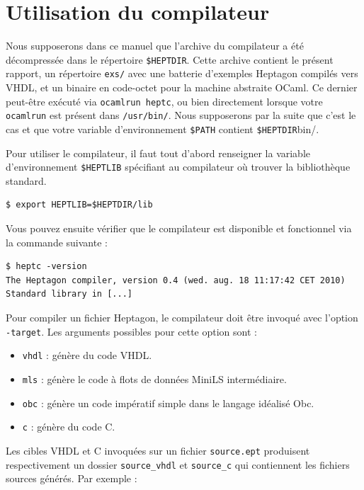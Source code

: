 \documentclass[9pt,a4paper]{article}
\newcommand{\LANG}{Heptagon}
\begin{document}
\small

\normalsize

\section{Utilisation du compilateur}

Nous supposerons dans ce manuel que l'archive du compilateur a été décompressée
dans le répertoire \verb/$HEPTDIR/. Cette archive contient le présent rapport,
un répertoire \texttt{exs/} avec une batterie d'exemples \LANG{} compilés vers
VHDL, et un binaire en code-octet pour la machine abstraite OCaml. Ce dernier
peut-être exécuté via \texttt{ocamlrun heptc}, ou bien directement lorsque votre
\texttt{ocamlrun} est présent dans \texttt{/usr/bin/}. Nous supposerons par la
suite que c'est le cas et que votre variable d'environnement \verb/$PATH/
contient \verb/$HEPTDIR/bin/.

Pour utiliser le compilateur, il faut tout d'abord renseigner la variable
d'environnement \verb/$HEPTLIB/ spécifiant au compilateur où trouver la
bibliothèque standard.

\begin{verbatim}
$ export HEPTLIB=$HEPTDIR/lib
\end{verbatim}

Vous pouvez ensuite vérifier que le compilateur est disponible et fonctionnel
via la commande suivante :

\begin{verbatim}
$ heptc -version
The Heptagon compiler, version 0.4 (wed. aug. 18 11:17:42 CET 2010)
Standard library in [...]
\end{verbatim}

Pour compiler un fichier \LANG{}, le compilateur doit être invoqué avec l'option
\verb/-target/. Les arguments possibles pour cette option sont :

\begin{itemize}
\item \verb/vhdl/ : génère du code VHDL.
\item \verb/mls/ : génère le code à flots de données MiniLS intermédiaire.
\item \verb/obc/ : génère un code impératif simple dans le langage idéalisé Obc.
\item \verb/c/ : génère du code C.
\end{itemize}

Les cibles VHDL et C invoquées sur un fichier \verb/source.ept/ produisent
respectivement un dossier \verb/source_vhdl/ et \verb/source_c/ qui contiennent
les fichiers sources générés. Par exemple :
\end{document}
